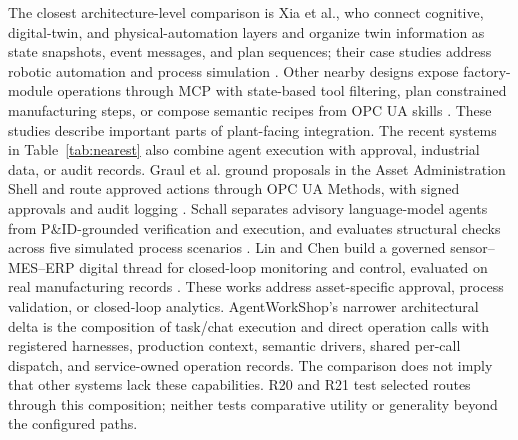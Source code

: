 The closest architecture-level comparison is Xia et al., who connect cognitive,
digital-twin, and physical-automation layers and organize twin information as
state snapshots, event messages, and plan sequences; their case studies
address robotic automation and process simulation
\cite{xia2025architecture}. Other nearby designs expose factory-module
operations through MCP with state-based tool filtering, plan constrained
manufacturing steps, or compose semantic recipes from OPC UA skills
\cite{koehle2026llmdriven,silva2025mcpmanufacturing,koehle2025semanticrecipes}.
These studies describe important parts of plant-facing integration. The
recent systems in Table~\ref{tab:nearest} also combine agent execution with
approval, industrial data, or audit records. Graul et al. ground proposals in
the Asset Administration Shell and route approved actions through OPC UA
Methods, with signed approvals and audit logging
\cite{graul2026aas}. Schall separates advisory language-model agents from
P\&ID-grounded verification and execution, and evaluates structural checks
across five simulated process scenarios
\cite{schall2026safe}. Lin and Chen build a governed sensor--MES--ERP digital
thread for closed-loop monitoring and control, evaluated on real manufacturing
records \cite{lin2026agentic}. These works address asset-specific approval,
process validation, or closed-loop analytics. AgentWorkShop's narrower
architectural delta is the composition of task/chat execution and direct
operation calls with registered harnesses, production context, semantic
drivers, shared per-call dispatch, and service-owned operation records. The
comparison does not imply that other systems lack these capabilities. R20 and
R21 test selected routes through this composition; neither tests comparative
utility or generality beyond the configured paths.
